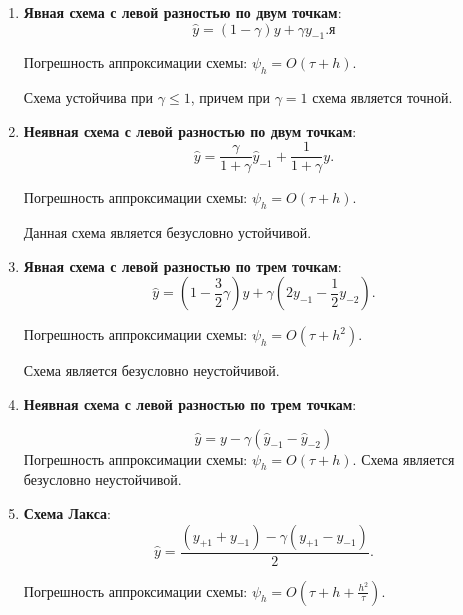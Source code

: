 \documentclass[12pt, a4paper]{article}
\begin{document}
\begin{enumerate}

	\item \textbf{Явная схема с левой разностью по двум точкам}:
	\begin{equation*}
		\widehat{y} = (1 - \gamma) y + \gamma y_{-1}.
		\label{s1}
я	\end{equation*}
	
	Погрешность аппроксимации схемы: 
	$\psi_h = O(\tau + h)$.
	
	Схема устойчива при $\gamma \leq 1 $, причем при $\gamma = 1$ схема является точной.
	
	\bigskip
	\item \textbf{Неявная схема с левой разностью по двум точкам}:
	\begin{equation*}
		\widehat{y} = \dfrac{\gamma}{1 + \gamma} \widehat{y}_{-1} + \dfrac{1}{1 + \gamma} y .
		\label{s2}
	\end{equation*}
	
	Погрешность аппроксимации схемы: $\psi_h = O(\tau + h)$.
	
	Данная схема является безусловно устойчивой.
	
	\bigskip
	\item \textbf{Явная схема с левой разностью по трем точкам}:
	\begin{equation*}
		\widehat{y} = (1 - \frac{3}{2}\gamma) y + \gamma(2y_{-1} - \frac{1}{2}y_{-2}).
		\label{s3}
	\end{equation*}
	
	Погрешность аппроксимации схемы: 
	$\psi_h = O(\tau + h^2)$.
	
	Схема является безусловно неустойчивой.
	
	\bigskip
	\item \textbf{Неявная схема с левой разностью по трем точкам}:
	
	\begin{equation*}
		\widehat{y} = y - \gamma (\widehat{y}_{-1} - \widehat{y}_{-2})
		\label{s4}
	\end{equation*}
	Погрешность аппроксимации схемы: $\psi_h = O(\tau + h)$.
	Схема является безусловно неустойчивой.
	
	\item \textbf{Схема Лакса}:
	\bigskip
	\begin{equation*}
		\widehat{y} = \dfrac{(y_{+1} + y_{-1}) - \gamma(y_{+1} - y_{-1})}{2} .
		\label{s5}
	\end{equation*}
	
	Погрешность аппроксимации схемы: $\psi_h = O(\tau + h + \frac{h^2 }{ \tau})$.
	

\end{enumerate}
\end{document}
